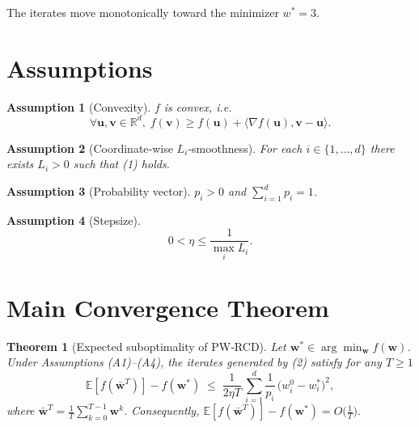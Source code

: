 \documentclass{article}
\newtheorem{theorem}{Theorem}
\newtheorem{assumption}{Assumption}
\newcommand{\E}{\mathbb{E}}
\newcommand{\R}{\mathbb{R}}
\newcommand{\ip}[2]{\langle #1,#2\rangle}
\begin{document}
The iterates move monotonically toward the minimizer $w^{*}=3$.

\newpage
\section*{Assumptions}
\begin{assumption}[Convexity]
$f$ is convex, i.e.
\[
\forall \bm u,\bm v\in\R^{d},\;
f(\bm v)\ge f(\bm u)+\ip{\nabla f(\bm u)}{\bm v-\bm u}. \tag{A1}
\]
\end{assumption}
\begin{assumption}[Coordinate‑wise $L_i$‑smoothness]
For each $i\in\{1,\dots ,d\}$ there exists $L_i>0$ such that (1) holds. 
\end{assumption}
\begin{assumption}[Probability vector]
$p_i>0$ and $\sum_{i=1}^{d}p_i=1$. 
\end{assumption}
\begin{assumption}[Stepsize]
\[
0<\eta\le \frac{1}{\max_{i}L_i}. \tag{A4}
\]
\end{assumption}

\section*{Main Convergence Theorem}
\begin{theorem}[Expected suboptimality of PW‑RCD]\label{thm:main}
Let $\bm w^{*}\in\arg\min_{\bm w}f(\bm w)$. Under Assumptions (A1)–(A4), the iterates generated by (2) satisfy for any $T$
\[
\E\!\left[f\!\left(\bar{\bm w}^{T}\right)\right]-f(\bm w^{*})
\;\le\;
\frac{1}{2\eta T}\,
\sum_{i=1}^{d}\frac{1}{p_i}\,
\bigl(w^{0}_{i}-w^{*}_{i}\bigr)^{2},
\tag{3}
\]
where $\bar{\bm w}^{T}=\sum_{k=0}^{T-1}\bm w^{k}$.
Consequently, $ \E[f(\bar{\bm w}^{T})]-f(\bm w^{*}) =O\!\bigl(\bigr). $
\end{theorem}
\end{document}
